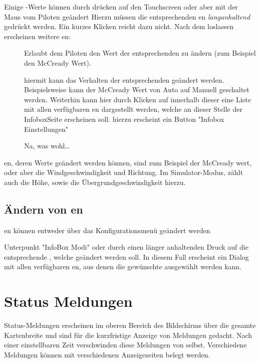 Einige {\InfoBox}-Werte können durch drücken auf den Touchscreen oder aber mit der Maus vom Piloten geändert
Hierzu müssen die entsprechenden {\InfoBox}en  \emph{langanhaltend} gedrückt werden.
Ein kurzes Klicken reicht dazu nicht.  Nach dem loslassen erscheinen weitere {\InfoBox}en:

\begin{description}
\item[]
Erlaubt dem Piloten den Wert der entsprechenden {\InfoBox} zu ändern (zum Beispiel den McCready Wert).

\item[]
hiermit kann das Verhalten der entsprechenden {\InfoBox} geändert werden. Beispielsweise kann der McCready Wert von Auto auf Manuell geschaltet werden.
Weiterhin kann hier durch Klicken auf   innerhalb dieser {\InfoBox}  eine Liste mit allen verfügbaren {\InfoBox}en dargestellt werden, welche an dieser Stelle der InfoboxSeite erscheinen soll. hierzu erscheint ein Button "Infobox Einstellungen"

\item[] Na, was wohl\dots
\end{description}

{\InfoBox}en, deren Werte geändert werden können, sind zum Beispiel der McCready wert, oder aber die Windgeschwindigkeit und Richtung. Im Simulator-Modus, zählt auch die Höhe, sowie die Übergrundgeschwindigkeit hierzu.

\subsection*{Ändern von {\InfoBox}en}
{\InfoBox}en können entweder über das Konfigurationsmenü geändert werden 
\begin{quote}
\blink{}\blink{}\blink{}
\end{quote}  Unterpunkt "InfoBox Modi"
oder durch einen länger anhaltenden Druck auf die entsprechende  {\InfoBox}, welche geändert werden soll.
 In diesem Fall erscheint ein Dialog mit allen verfügbaren {\InfoBox}en, aus denen die gewünschte ausgewählt werden kann.

\section{Status Meldungen}
Status-Meldungen erscheinen im oberen Bereich des Bildschirms über die gesamte Kartenbreite und sind für die kurzfristige Anzeige von Meldungen gedacht. Nach einer einstellbaren Zeit verschwinden diese Meldungen von selbst. Verschiedene Meldungen können mit verschiedenen Anzeigezeiten belegt werden.

